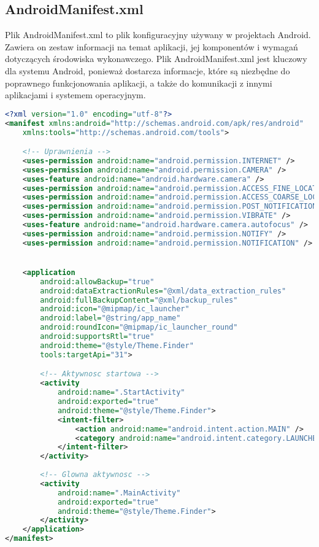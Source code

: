 \subsection{AndroidManifest.xml}
\hspace{0,60 cm} Plik AndroidManifest.xml to plik konfiguracyjny używany w projektach Android. Zawiera on zestaw informacji na temat aplikacji, jej komponentów i wymagań dotyczących środowiska wykonawczego. Plik AndroidManifest.xml jest kluczowy dla systemu Android, ponieważ dostarcza informacje, które są niezbędne do poprawnego funkcjonowania aplikacji, a także do komunikacji z innymi aplikacjami i systemem operacyjnym.
\begin{lstlisting}[caption=AndroidManifest.xml, label={lst:kod.xml}, language=XML]
<?xml version="1.0" encoding="utf-8"?>
<manifest xmlns:android="http://schemas.android.com/apk/res/android"
    xmlns:tools="http://schemas.android.com/tools">

    <!-- Uprawnienia -->
    <uses-permission android:name="android.permission.INTERNET" />
    <uses-permission android:name="android.permission.CAMERA" />
    <uses-feature android:name="android.hardware.camera" />
    <uses-permission android:name="android.permission.ACCESS_FINE_LOCATION" />
    <uses-permission android:name="android.permission.ACCESS_COARSE_LOCATION" />
    <uses-permission android:name="android.permission.POST_NOTIFICATIONS" />
    <uses-permission android:name="android.permission.VIBRATE" />
    <uses-feature android:name="android.hardware.camera.autofocus" />
    <uses-permission android:name="android.permission.NOTIFY" />
    <uses-permission android:name="android.permission.NOTIFICATION" />


    <application
        android:allowBackup="true"
        android:dataExtractionRules="@xml/data_extraction_rules"
        android:fullBackupContent="@xml/backup_rules"
        android:icon="@mipmap/ic_launcher"
        android:label="@string/app_name"
        android:roundIcon="@mipmap/ic_launcher_round"
        android:supportsRtl="true"
        android:theme="@style/Theme.Finder"
        tools:targetApi="31">

        <!-- Aktywnosc startowa -->
        <activity
            android:name=".StartActivity"
            android:exported="true"
            android:theme="@style/Theme.Finder">
            <intent-filter>
                <action android:name="android.intent.action.MAIN" />
                <category android:name="android.intent.category.LAUNCHER" />
            </intent-filter>
        </activity>
        
        <!-- Glowna aktywnosc -->
        <activity
            android:name=".MainActivity"
            android:exported="true"
            android:theme="@style/Theme.Finder">
        </activity>
    </application>
</manifest>
\end{lstlisting}

